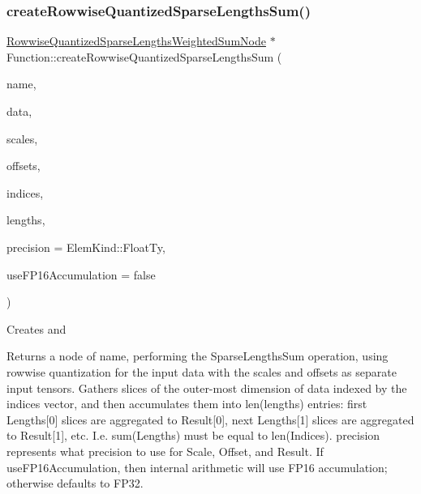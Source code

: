 \subsubsection{\texorpdfstring{create\+Rowwise\+Quantized\+Sparse\+Lengths\+Sum()}{createRowwiseQuantizedSparseLengthsSum()}\hspace{0.1cm}{\footnotesize\ttfamily [1/2]}}
{\footnotesize\ttfamily \hyperlink{classglow_1_1_rowwise_quantized_sparse_lengths_weighted_sum_node}{Rowwise\+Quantized\+Sparse\+Lengths\+Weighted\+Sum\+Node} $\ast$ Function\+::create\+Rowwise\+Quantized\+Sparse\+Lengths\+Sum (\begin{DoxyParamCaption}\item[{llvm\+::\+String\+Ref}]{name,  }\item[{\hyperlink{classglow_1_1_constant}{Constant} $\ast$}]{data,  }\item[{\hyperlink{classglow_1_1_constant}{Constant} $\ast$}]{scales,  }\item[{\hyperlink{classglow_1_1_constant}{Constant} $\ast$}]{offsets,  }\item[{\hyperlink{structglow_1_1_node_value}{Node\+Value}}]{indices,  }\item[{\hyperlink{structglow_1_1_node_value}{Node\+Value}}]{lengths,  }\item[{\hyperlink{namespaceglow_ab92e14a94329daf4083db670e95fbcdf}{Elem\+Kind}}]{precision = {\ttfamily ElemKind\+:\+:FloatTy},  }\item[{bool}]{use\+F\+P16\+Accumulation = {\ttfamily false} }\end{DoxyParamCaption})}

Creates and \begin{DoxyReturn}{Returns}
a node of {\ttfamily name}, performing the Sparse\+Lengths\+Sum operation, using rowwise quantization for the input {\ttfamily data} with the {\ttfamily scales} and {\ttfamily offsets} as separate input tensors. Gathers slices of the outer-\/most dimension of data indexed by the {\ttfamily indices} vector, and then accumulates them into len({\ttfamily lengths}) entries\+: first Lengths\mbox{[}0\mbox{]} slices are aggregated to Result\mbox{[}0\mbox{]}, next Lengths\mbox{[}1\mbox{]} slices are aggregated to Result\mbox{[}1\mbox{]}, etc. I.\+e. sum(\+Lengths) must be equal to len(\+Indices). {\ttfamily precision} represents what precision to use for Scale, Offset, and Result. If {\ttfamily use\+F\+P16\+Accumulation}, then internal arithmetic will use F\+P16 accumulation; otherwise defaults to F\+P32. 
\end{DoxyReturn}
\mbox{\label{classglow_1_1_function_ae7977506330eaf13bc3c39d63d83c333}} 
